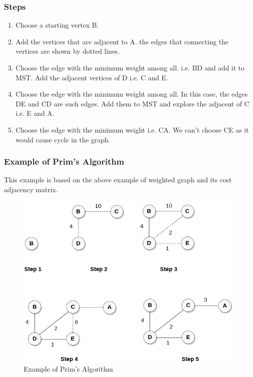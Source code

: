 \documentclass[11pt]{article}
\begin{document}
\subsubsection{Steps}
\begin{enumerate}
    \item Choose a starting vertex B.
    \item Add the vertices that are adjacent to A. the edges that connecting the vertices are shown by dotted lines.
    \item Choose the edge with the minimum weight among all. i.e. BD and add it to MST. Add the adjacent vertices of D i.e. C and E.
    \item Choose the edge with the minimum weight among all. In this case, the edges DE and CD are such edges. Add them to MST and explore the adjacent of C i.e. E and A.
    \item Choose the edge with the minimum weight i.e. CA. We can't choose CE as it would cause cycle in the graph.
    
\end{enumerate}

\subsubsection{Example of Prim's Algorithm}

This example is based on the above example of weighted graph and its cost adjacency matrix.

\begin{figure}[H]
    \centering
    \includegraphics[width=.85\textwidth]{figures/primeg.png}
    \caption{ Example of Prim's Algorithm }
\end{figure}
\end{document}
